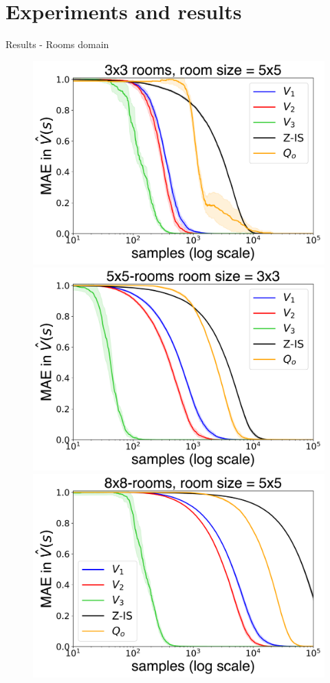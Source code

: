 \documentclass{beamer}
\theoremstyle{mystyle}
\begin{document}
\section{Experiments and results}

\begin{frame}{Results - Rooms domain}

    \begin{figure}[H]
        \centering
        \includegraphics[scale=0.2]{Figures/nroom_3_3-1.png}
        \includegraphics[scale=0.2]{Figures/nroom_5_5-1.png}
        \includegraphics[scale=0.2]{Figures/nroom_8_8-1.png}


\end{figure}
\end{frame}
\end{document}
